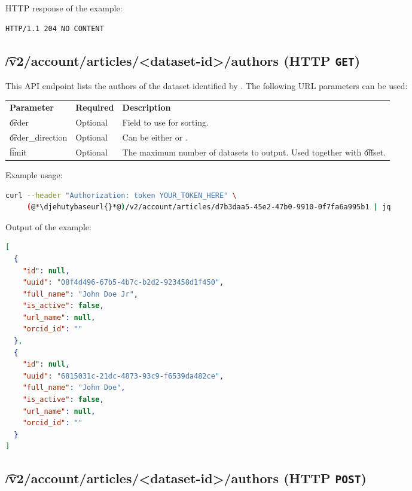   HTTP response of the example:
\begin{lstlisting}
HTTP/1.1 204 NO CONTENT
\end{lstlisting}

\subsection{\t{/v2/account/articles/<dataset-id>/authors} (HTTP \texttt{GET})}
\label{sec:api-v2-articles-authors}

  This API endpoint lists the authors of the dataset identified by .
  The following URL parameters can be used:

\begin{tabularx}{\textwidth}{*{2}{!{\VRule[-1pt]}l}!{\VRule[-1pt]}X}
  \headrow
  \textbf{Parameter}   & \textbf{Required} & \textbf{Description}\\
  \t{order}            & Optional & Field to use for sorting.\\
  \t{order\_direction} & Optional & Can be either  or .\\
  \t{limit}            & Optional & The maximum number of datasets to output.
                                    Used together with \t{offset}.\\
\end{tabularx}

  Example usage:
\begin{lstlisting}[language=bash]
curl --header "Authorization: token YOUR_TOKEN_HERE" \
     (@*\djehutybaseurl{}*@)/v2/account/articles/d7b3daa5-45e2-47b0-9910-0f7fa6a995b1 | jq
\end{lstlisting}

  Output of the example:
\begin{lstlisting}[language=JSON]
[
  {
    "id": null,
    "uuid": "08f4d496-67b5-4b7c-b2d2-923458d1f450",
    "full_name": "John Doe Jr",
    "is_active": false,
    "url_name": null,
    "orcid_id": ""
  },
  {
    "id": null,
    "uuid": "6815031c-21dc-4873-93c9-f6539da482ce",
    "full_name": "John Doe",
    "is_active": false,
    "url_name": null,
    "orcid_id": ""
  }
]
\end{lstlisting}

\subsection{\t{/v2/account/articles/<dataset-id>/authors} (HTTP \texttt{POST})}
\label{sec:api-v2-articles-authors-post}

